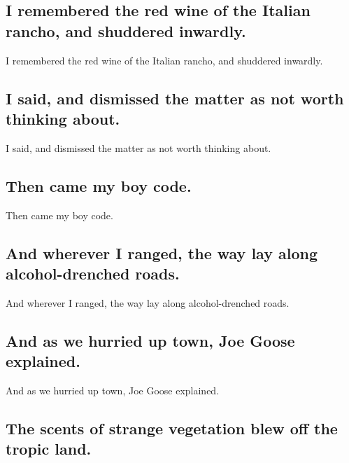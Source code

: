 \documentclass[]{article}
\begin{document}
\hypertarget{i-remembered-the-red-wine-of-the-italian-rancho-and-shuddered-inwardly.}{%
\subsection{I remembered the red wine of the Italian rancho, and
shuddered
inwardly.}\label{i-remembered-the-red-wine-of-the-italian-rancho-and-shuddered-inwardly.}}

I remembered the red wine of the Italian rancho, and shuddered inwardly.

\hypertarget{i-said-and-dismissed-the-matter-as-not-worth-thinking-about.}{%
\subsection{I said, and dismissed the matter as not worth thinking
about.}\label{i-said-and-dismissed-the-matter-as-not-worth-thinking-about.}}

I said, and dismissed the matter as not worth thinking about.

\hypertarget{then-came-my-boy-code.}{%
\subsection{Then came my boy code.}\label{then-came-my-boy-code.}}

Then came my boy code.

\hypertarget{and-wherever-i-ranged-the-way-lay-along-alcohol-drenched-roads.}{%
\subsection{And wherever I ranged, the way lay along alcohol-drenched
roads.}\label{and-wherever-i-ranged-the-way-lay-along-alcohol-drenched-roads.}}

And wherever I ranged, the way lay along alcohol-drenched roads.

\hypertarget{and-as-we-hurried-up-town-joe-goose-explained.}{%
\subsection{And as we hurried up town, Joe Goose
explained.}\label{and-as-we-hurried-up-town-joe-goose-explained.}}

And as we hurried up town, Joe Goose explained.

\hypertarget{the-scents-of-strange-vegetation-blew-off-the-tropic-land.}{%
\subsection{The scents of strange vegetation blew off the tropic
land.}\label{the-scents-of-strange-vegetation-blew-off-the-tropic-land.}}
\end{document}

